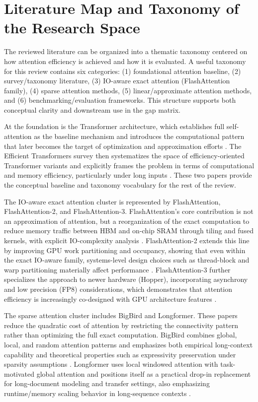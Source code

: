 \documentclass[12pt, a4paper]{article}
\begin{document}
\section{Literature Map and Taxonomy of the Research Space}

The reviewed literature can be organized into a thematic taxonomy centered on how attention efficiency is achieved and how it is evaluated. A useful taxonomy for this review contains six categories: (1) foundational attention baseline, (2) survey/taxonomy literature, (3) IO-aware exact attention (FlashAttention family), (4) sparse attention methods, (5) linear/approximate attention methods, and (6) benchmarking/evaluation frameworks. This structure supports both conceptual clarity and downstream use in the gap matrix.

At the foundation is the Transformer architecture, which establishes full self-attention as the baseline mechanism and introduces the computational pattern that later becomes the target of optimization and approximation efforts \parencite{vaswani2023attentionneed}. The Efficient Transformers survey then systematizes the space of efficiency-oriented Transformer variants and explicitly frames the problem in terms of computational and memory efficiency, particularly under long inputs \parencite{10.1145/3530811}. These two papers provide the conceptual baseline and taxonomy vocabulary for the rest of the review.

The IO-aware exact attention cluster is represented by FlashAttention, FlashAttention-2, and FlashAttention-3. FlashAttention's core contribution is not an approximation of attention, but a reorganization of the exact computation to reduce memory traffic between HBM and on-chip SRAM through tiling and fused kernels, with explicit IO-complexity analysis \parencite{dao2022flashattentionfastmemoryefficientexact}. FlashAttention-2 extends this line by improving GPU work partitioning and occupancy, showing that even within the exact IO-aware family, systems-level design choices such as thread-block and warp partitioning materially affect performance \parencite{dao2023flashattention2fasterattentionbetter}. FlashAttention-3 further specializes the approach to newer hardware (Hopper), incorporating asynchrony and low precision (FP8) considerations, which demonstrates that attention efficiency is increasingly co-designed with GPU architecture features \parencite{shah2024flashattention3fastaccurateattention}.

The sparse attention cluster includes BigBird and Longformer. These papers reduce the quadratic cost of attention by restricting the connectivity pattern rather than optimizing the full exact computation. BigBird combines global, local, and random attention patterns and emphasizes both empirical long-context capability and theoretical properties such as expressivity preservation under sparsity assumptions \parencite{zaheer2021bigbirdtransformerslonger}. Longformer uses local windowed attention with task-motivated global attention and positions itself as a practical drop-in replacement for long-document modeling and transfer settings, also emphasizing runtime/memory scaling behavior in long-sequence contexts \parencite{beltagy2020longformerlongdocumenttransformer}.
\end{document}
